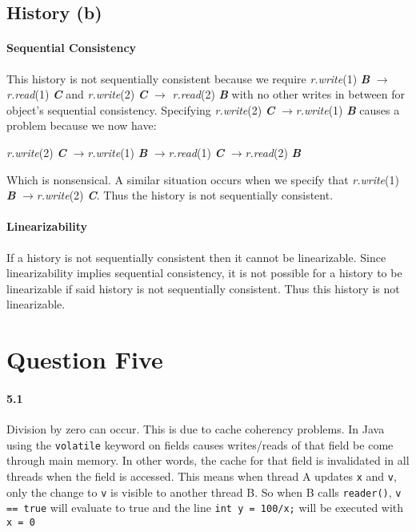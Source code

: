 \documentclass[12pt,letterpaper,titlepage]{article}
\newcommand{\methodcall}[4]{\textlangle{}\emph{#1.#2}(#3) \emph{\textbf{#4}}\textrangle{}}
\newcommand{\pre}{$\rightarrow$}
\begin{document}
    \subsection{History (b)}
        \paragraph{Sequential Consistency} This history is not sequentially consistent because we require \methodcall{r}{write}{1}{B} $\rightarrow$ \methodcall{r}{read}{1}{C} and \methodcall{r}{write}{2}{C} $\rightarrow$ \methodcall{r}{read}{2}{B} with no other writes in between for object's sequential consistency. Specifying \methodcall{r}{write}{2}{C} \pre \methodcall{r}{write}{1}{B} causes a problem because we now have:
        
        \methodcall{r}{write}{2}{C} \pre \methodcall{r}{write}{1}{B} \pre \methodcall{r}{read}{1}{C} \pre \methodcall{r}{read}{2}{B}
        
        Which is nonsensical. A similar situation occurs when we specify that \methodcall{r}{write}{1}{B} \pre \methodcall{r}{write}{2}{C}. Thus the history is not sequentially consistent.
        
        \paragraph{Linearizability} If a history is not sequentially consistent then it cannot be linearizable. Since linearizability implies sequential consistency, it is not possible for a history to be linearizable if said history is not sequentially consistent. Thus this history is not linearizable.
        
  \section{Question Five}
    \paragraph{5.1} Division by zero can occur. This is due to cache coherency problems. In Java using the \texttt{volatile} keyword on fields causes writes/reads of that field be come through main memory. In other words, the cache for that field is invalidated in all threads when the field is accessed. This means when thread A updates \texttt{x} and \texttt{v}, only the change to \texttt{v} is visible to another thread B. So when B calls \texttt{reader()}, \texttt{v == true} will evaluate to true and the line \texttt{int y = 100/x;} will be executed with \texttt{x = 0}
    
\end{document}
